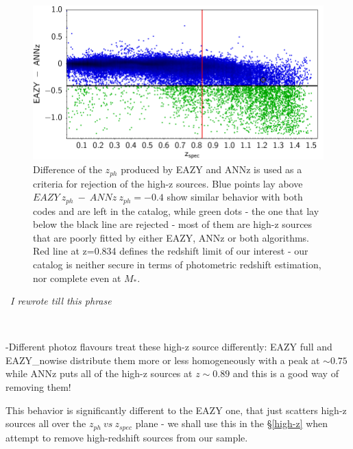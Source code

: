 \documentclass[apj,iop]{emulateapj}
\begin{document}
\begin{figure}
\begin{minipage}{\columnwidth}
\includegraphics[width=\columnwidth,height=0.28\textheight]{figures/high_z/criteria.png}
\caption{Difference of the $z_{ph}$ produced by EAZY and ANNz is used as a criteria for rejection of the high-z sources. Blue points lay above $EAZY\ z_{ph}\ -\ ANNz\ z_{ph} = -0.4$ show similar behavior with both codes and are left in the catalog, while green dots - the one that lay below the black line are rejected - most of them are high-z sources that are poorly fitted by either EAZY, ANNz or both algorithms. Red line at z=0.834 defines the redshift limit of our interest - our catalog is neither secure in terms of photometric redshift estimation, nor complete even at $M_{\ast}$.}
\label{fig:criteria}
\end{minipage}
\end{figure}

\
{\it I rewrote till this phrase}

\

-Different photoz flavours treat these high-z source differently:
	EAZY full and EAZY\_nowise distribute them more or less homogeneously with a peak at $\sim0.75$ while ANNz puts all of the high-z sources at $z\sim0.89$ and this is a good way of removing them!
	
This behavior is significantly different to the EAZY one, that just scatters high-z sources all over the $z_{ph}\ vs\ z_{spec}$ plane - we shall use this in the \S \ref{high-z} when attempt to remove high-redshift sources from our sample.	
	
\end{document}

